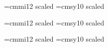 \begin{\parsearg\beginxxx}
\setfont\chaprm{}
\setfont\chapit{}
\setfont\chapsl{}
\setfont\chaptt{}
\setfont\chapttsl{}
\setfont\chapsf{}
\let\chapbf=\chaprm
\setfont\chapsc{}
\font\chapi=cmmi12 scaled 
\font\chapsy=cmsy10 scaled 

\setfont\secrm{}
\setfont\secit{}
\setfont\secsl{}
\setfont\sectt{}
\setfont\secttsl{}
\setfont\secsf{}
\let\secbf\secrm
\setfont\secsc{}
\font\seci=cmmi12 scaled 
\font\secsy=cmsy10 scaled 




\setfont\ssecrm{}
\setfont\ssecit{}
\setfont\ssecsl{}
\setfont\ssectt{}
\setfont\ssecttsl{}
\setfont\ssecsf{}
\let\ssecbf\ssecrm
\setfont\ssecsc{}
\font\sseci=cmmi12 scaled \magstephalf
\font\ssecsy=cmsy10 scaled 

\setfont\titlerm{}
\let\authorrm = \secrm

%
\def\resetmathfonts{%
  \textfont0 = \tenrm \textfont1 = \teni \textfont2 = \tensy
  \textfont\itfam = \tenit \textfont\slfam = \tensl \textfont\bffam = \tenbf
  \textfont\ttfam = \tentt \textfont\sffam = \tensf
}



\end{\parsearg\beginxxx}

